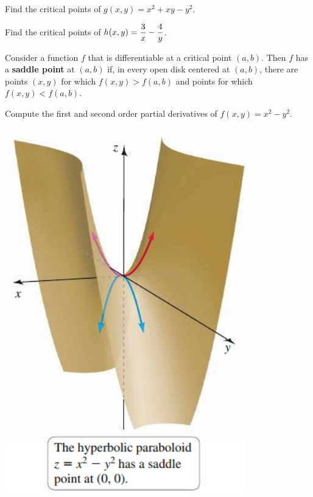 \documentclass[mathNotesPreamble]{subfiles}
\begin{document}
  \begin{ex*}
    Find the critical points of $g(x,y)=x^2+xy-y^2$.
  \end{ex*}

  \begin{ex*}
    Find the critical points of $\displaystyle h(x,y)=\frac{3}{x}-\frac{4}{y}$.
  \end{ex*}

  \pagebreak

  \begin{defn*}
    Consider a function $f$ that is differentiable at a critical point $(a,b)$. Then $f$ has a \textbf{saddle point} at $(a,b)$ if, in every open disk centered at $(a,b)$, there are points $(x,y)$ for which $f(x,y)>f(a,b)$ and points for which $f(x,y)<f(a,b)$.
  \end{defn*}

  \noindent
  \begin{minipage}[t]{0.65\linewidth}
    \begin{ex*}
      Compute the first and second order partial derivatives of $f(x,y)=x^2-y^2$.
    \end{ex*}
  \end{minipage}%
  \begin{minipage}[t]{0.35\linewidth}\mbox{}
    \begin{flushright}
      \includegraphics[width=0.8\linewidth]{images/briggs_15_07/fig15_68}
    \end{flushright}
  \end{minipage}
\end{document}
